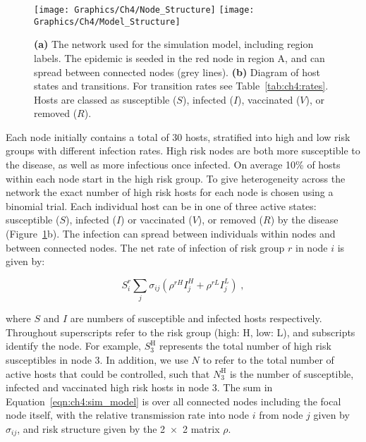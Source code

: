 \begin{figure}[htb]
    \centering
    \texttt{[image: Graphics/Ch4/Node\_Structure]}
    \texttt{[image: Graphics/Ch4/Model\_Structure]}
    \caption{\textbf{(a)} The network used for the simulation model, including region labels. The epidemic is seeded in the red node in region A, and can spread between connected nodes (grey lines). \textbf{(b)} Diagram of host states and transitions. For transition rates see Table~\ref{tab:ch4:rates}. Hosts are classed as susceptible ($S$), infected ($I$), vaccinated ($V$), or removed ($R$). }
    \label{fig:ch4:node_structure_and_model}
\end{figure}

Each node initially contains a total of 30 hosts, stratified into high and low risk groups with different infection rates. High risk nodes are both more susceptible to the disease, as well as more infectious once infected. On average 10\% of hosts within each node start in the high risk group. To give heterogeneity across the network the exact number of high risk hosts for each node is chosen using a binomial trial. Each individual host can be in one of three active states: susceptible ($S$), infected ($I$) or vaccinated ($V$), or removed ($R$) by the disease (Figure~\ref{fig:ch4:node_structure_and_model}b). The infection can spread between individuals within nodes and between connected nodes. The net rate of infection of risk group $r$ in node $i$ is given by:
\begin{linenomath*}
    \begin{equation}
        S_i^r \sum_j \sigma_{ij} \left(\rho^{rH}I_j^H + \rho^{rL}I_j^L\right)\;,
    \label{eqn:ch4:sim_model}
    \end{equation}
\end{linenomath*}
where $S$ and $I$ are numbers of susceptible and infected hosts respectively. Throughout superscripts refer to the risk group (high: H, low: L), and subscripts identify the node. For example, $S_{3}^\mathrm{H}$ represents the total number of high risk susceptibles in node 3. In addition, we use $N$ to refer to the total number of active hosts that could be controlled, such that $N_{3}^\mathrm{H}$ is the number of susceptible, infected and vaccinated high risk hosts in node 3. The sum in Equation~\ref{eqn:ch4:sim_model} is over all connected nodes including the focal node itself, with the relative transmission rate into node $i$ from node $j$ given by $\sigma_{ij}$, and risk structure given by the \num{2x2} matrix $\rho$.

